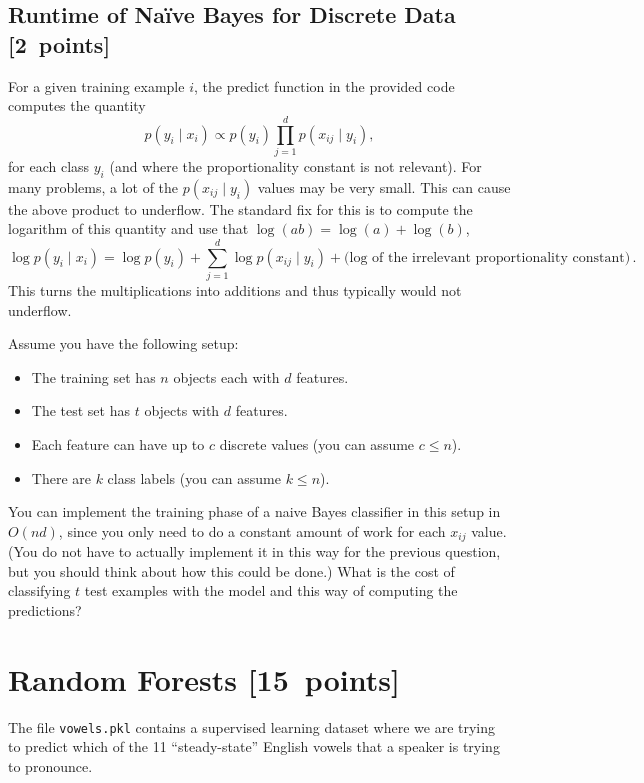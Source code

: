 \documentclass{article}
\newcommand{\blu}[1]{{\textcolor{blu}{#1}}}
\let\ask\blu
\newcommand\pts[1]{\textcolor{pointscolour}{[#1~points]}}
\begin{document}
    \clearpage
    \subsection{Runtime of Na\"ive Bayes for Discrete Data \pts{2}}

    For a given training example $i$, the predict function in the provided code computes the quantity
    \[
    p(y_i \mid x_i) \propto p(y_i)\prod_{j=1}^d p(x_{ij} \mid y_i),
    \]
    for each class $y_i$ (and where the proportionality constant is not relevant). For many problems, a lot of the $p(x_{ij} \mid y_i)$ values may be very small. This can cause the above product to underflow. The standard fix for this is to compute the logarithm of this quantity and use that $\log(ab) = \log(a)+\log(b)$,
    \[
    \log p(y_i \mid x_i) = \log p(y_i) + \sum_{j=1}^d \log p(x_{ij} \mid y_i) + \text{(log of the irrelevant proportionality constant)} \, .
    \]
    This turns the multiplications into additions and thus typically would not underflow.

    Assume you have the following setup:
    \begin{itemize}
        \item The training set has $n$ objects each with $d$ features.
        \item The test set has $t$ objects with $d$ features.
        \item Each feature can have up to $c$ discrete values (you can assume $c \leq n$).
        \item There are $k$ class labels (you can assume $k \leq n$).
    \end{itemize}
    You can implement the training phase of a naive Bayes classifier in this setup in $O(nd)$, since you only need to do a constant amount of work for each $x_{ij}$ value. (You do not have to actually implement it in this way for the previous question, but you should think about how this could be done.)
    \ask{What is the cost of classifying $t$ test examples with the model and this way of computing the predictions?}


    \clearpage
    \section{Random Forests \pts{15}}

    The file \texttt{vowels.pkl} contains a supervised learning dataset where we are trying to predict which of the 11 ``steady-state'' English vowels that a speaker is trying to pronounce.
\end{document}
